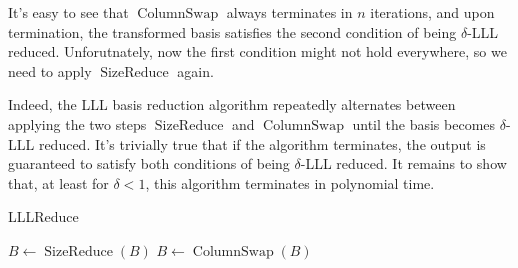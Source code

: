 It's easy to see that $\operatorname{ColumnSwap}$ always terminates in $n$ iterations, and upon termination, the transformed basis satisfies the second condition of being $\delta$-LLL reduced. Unforutnately, now the first condition might not hold everywhere, so we need to apply $\operatorname{SizeReduce}$ again.

Indeed, the LLL basis reduction algorithm repeatedly alternates between applying the two steps $\operatorname{SizeReduce}$ and $\operatorname{ColumnSwap}$ until the basis becomes $\delta$-LLL reduced. It's trivially true that if the algorithm terminates, the output is guaranteed to satisfy both conditions of being $\delta$-LLL reduced. It remains to show that, at least for $\delta < 1$, this algorithm terminates in polynomial time.

\begin{algorithm}
\caption{LLLReduce}
\begin{algorithmic}[1]
        \State $B \leftarrow \operatorname{SizeReduce}(B)$
        \State $B \leftarrow \operatorname{ColumnSwap}(B)$
    \EndWhile
\end{algorithmic}
\end{algorithm}

